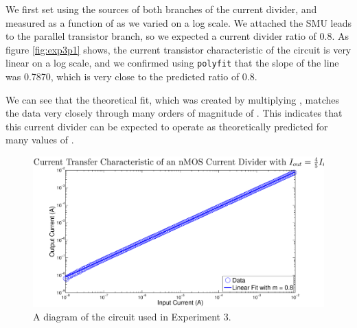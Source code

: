 We first set \Iin using the sources of both branches of the current divider, and measured \Iout as a function of \Iin as we varied \Iin on a log scale. We attached the SMU leads to the parallel transistor branch, so we expected a current divider ratio of 0.8. As figure \ref{fig:exp3p1} shows, the current transistor characteristic of the circuit is very linear on a log scale, and we confirmed using \texttt{polyfit} that the slope of the line was 0.7870, which is very close to the predicted ratio of 0.8.

We can see that the theoretical fit, which was created by multiplying , matches the data very closely through many orders of magnitude of \Iin. This indicates that this current divider can be expected to operate as theoretically predicted for many values of \Iin.

\begin{figure}[H]
\centering
\includegraphics[width=\linewidth]{../Figures/Experiment3Figure1.eps}
\caption{A diagram of the circuit used in Experiment 3.}
\label{fig:exp3p2}
\end{figure}
